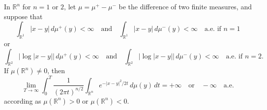 In $\mathbb{R}^n$ for $n = 1$ or $2$, let $\mu = \mu^+ - \mu^-$ be the difference of two finite measures, and suppose that
$$\int_{\mathbb{R}^1} |x - y| \, d\mu^+(y) < \infty \quad \text{and} \quad \int_{\mathbb{R}^1} |x - y| \, d\mu^-(y) < \infty \quad \text{a.e.\ if } n = 1$$
or
$$\int_{\mathbb{R}^2} |\log |x - y|| \, d\mu^+(y) < \infty \quad \text{and} \quad \int_{\mathbb{R}^2} |\log |x - y|| \, d\mu^-(y) < \infty \quad \text{a.e.\ if } n = 2.$$
If $\mu(\mathbb{R}^n) \neq 0$, then
$$\lim_{T \to \infty} \int_0^T \frac{1}{(2\pi t)^{n/2}} \int_{\mathbb{R}^n} e^{-|x - y|^2/2t} \, d\mu(y) \, dt = +\infty \quad \text{or} \quad -\infty \quad \text{a.e.}$$
according as $\mu(\mathbb{R}^n) > 0$ or $\mu(\mathbb{R}^n) < 0$.
